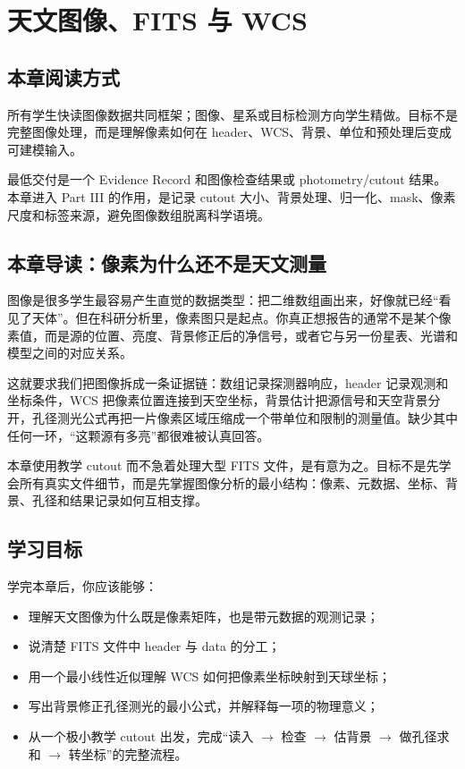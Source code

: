 \chapter{天文图像、FITS 与 WCS}

\section{本章阅读方式}

所有学生快读图像数据共同框架；图像、星系或目标检测方向学生精做。目标不是完整图像处理，而是理解像素如何在 header、WCS、背景、单位和预处理后变成可建模输入。

最低交付是一个 Evidence Record 和图像检查结果或 photometry/cutout 结果。本章进入 Part III 的作用，是记录 cutout 大小、背景处理、归一化、mask、像素尺度和标签来源，避免图像数组脱离科学语境。

\section{本章导读：像素为什么还不是天文测量}

图像是很多学生最容易产生直觉的数据类型：把二维数组画出来，好像就已经“看见了天体”。但在科研分析里，像素图只是起点。你真正想报告的通常不是某个像素值，而是源的位置、亮度、背景修正后的净信号，或者它与另一份星表、光谱和模型之间的对应关系。

这就要求我们把图像拆成一条证据链：数组记录探测器响应，header 记录观测和坐标条件，WCS 把像素位置连接到天空坐标，背景估计把源信号和天空背景分开，孔径测光公式再把一片像素区域压缩成一个带单位和限制的测量值。缺少其中任何一环，“这颗源有多亮”都很难被认真回答。

本章使用教学 cutout 而不急着处理大型 FITS 文件，是有意为之。目标不是先学会所有真实文件细节，而是先掌握图像分析的最小结构：像素、元数据、坐标、背景、孔径和结果记录如何互相支撑。

\section{学习目标}

学完本章后，你应该能够：

\begin{itemize}
    \item 理解天文图像为什么既是像素矩阵，也是带元数据的观测记录；
    \item 说清楚 FITS 文件中 header 与 data 的分工；
    \item 用一个最小线性近似理解 WCS 如何把像素坐标映射到天球坐标；
    \item 写出背景修正孔径测光的最小公式，并解释每一项的物理意义；
    \item 从一个极小教学 cutout 出发，完成“读入 $\rightarrow$ 检查 $\rightarrow$ 估背景 $\rightarrow$ 做孔径求和 $\rightarrow$ 转坐标”的完整流程。
\end{itemize}

